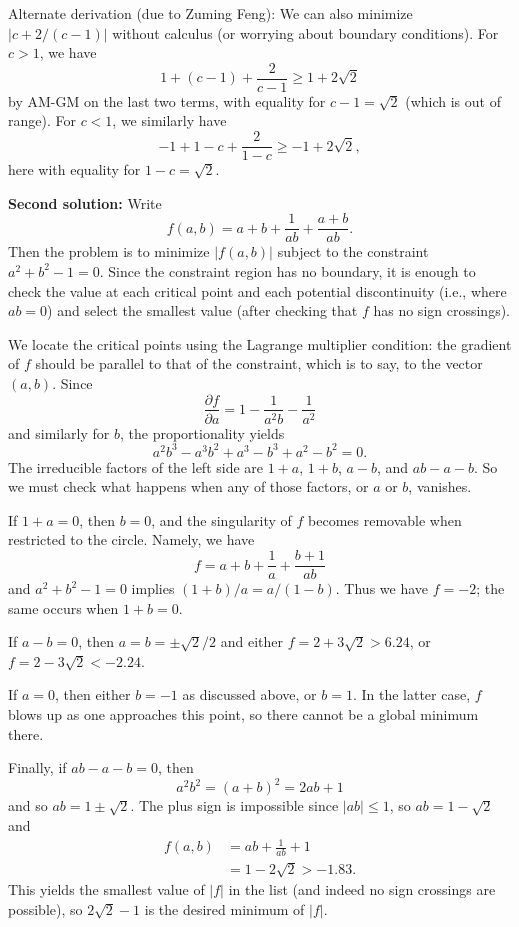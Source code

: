 \documentclass[amssymb,twocolumn,pra,10pt,aps]{revtex4-1}
\begin{document}
\begin{itemize}
Alternate derivation (due to Zuming Feng): We can also minimize $|c + 2/(c-1)|$
without calculus (or worrying about boundary conditions). For $c>1$, we have
\[
1 + (c-1) + \frac{2}{c-1} \geq 1 + 2 \sqrt{2}
\]
by AM-GM on the last two terms, with equality for $c-1 = \sqrt{2}$
(which is out of range).
For $c<1$, we similarly have
\[
-1 + 1-c + \frac{2}{1-c} \geq -1 + 2\sqrt{2},
\]
here with equality for $1-c = \sqrt{2}$.

\textbf{Second solution:}
Write
\[
f(a,b) = a+b + \frac{1}{ab} + \frac{a+b}{ab}.
\]
Then the problem is to minimize $|f(a,b)|$ subject to the constraint
$a^2+b^2-1 = 0$. Since the constraint region has no boundary, it is
enough to check the value at each critical point and each potential
discontinuity (i.e., where $ab=0$) and select the smallest value
(after checking that $f$ has no sign crossings).

We locate the critical points using the Lagrange multiplier condition:
the gradient of $f$ should be parallel to that of the constraint, which is
to say, to the vector $(a,b)$. Since
\[
\frac{\partial f}{\partial a}
= 1 - \frac{1}{a^2 b} - \frac{1}{a^2}
\]
and similarly for $b$, the proportionality yields
\[
a^2 b^3 - a^3 b^2 + a^3 - b^3 + a^2 - b^2 = 0.
\]
The irreducible factors of the left side are $1+a$, $1+b$,
$a-b$, and $ab-a-b$. So we must check what happens when any of
those factors, or $a$ or $b$, vanishes.

If $1+a = 0$, then $b=0$, and the singularity of $f$ becomes removable
when restricted to the circle. Namely, we have
\[
f = a + b + \frac{1}{a} + \frac{b+1}{ab}
\]
and $a^2+b^2-1 = 0$ implies $(1+b)/a = a/(1-b)$. Thus we have
$f = -2$; the same occurs when $1+b=0$.

If $a-b=0$, then $a=b=\pm \sqrt{2}/2$ and either
$f = 2 + 3 \sqrt{2} > 6.24$, or $f = 2 - 3 \sqrt{2} < -2.24$.

If $a=0$, then either $b = -1$ as discussed above, or $b=1$. In the
latter case, $f$ blows up as one approaches this point, so there cannot
be a global minimum there.

Finally, if $ab-a-b = 0$, then
\[
a^2b^2 = (a + b)^2 = 2ab + 1
\]
and so $ab = 1 \pm \sqrt{2}$. The plus sign is impossible since
$|ab| \leq 1$, so $ab = 1 - \sqrt{2}$ and
\begin{align*}
f(a,b) &= ab + \frac{1}{ab} + 1 \\
&= 1 - 2 \sqrt{2} > -1.83.
\end{align*}
This yields the smallest value of $|f|$ in the list (and indeed no sign
crossings are possible), so $2\sqrt{2}-1$ is the desired minimum of $|f|$.


\end{itemize}
\end{document}
